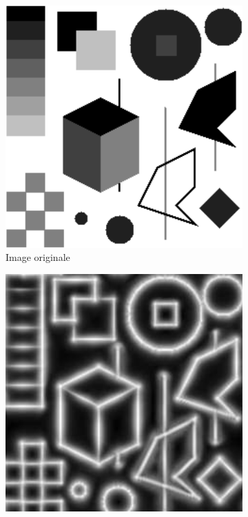\begin{figure}
    \centering
    \begin{subfigure}{.3\textwidth}
        \centering
        \includegraphics[width=\textwidth]{contenu/resources/images/geometry_shapes}
        \caption{Image originale}
    \end{subfigure}
    \hfill
    \begin{subfigure}{.3\textwidth}
        \centering
        \includegraphics[width=\textwidth]{contenu/resources/images/geometric_shapes_pc_kovesi_cropped}

\end{subfigure}
\end{figure}
